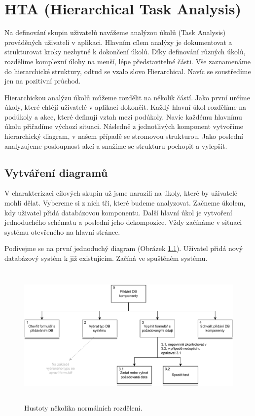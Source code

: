 \chapter{HTA (Hierarchical Task Analysis)}

Na definování skupin uživatelů navážeme analýzou úkolů (Task Analysis) prováděných uživateli v aplikaci. Hlavním cílem analýzy je dokumentovat a strukturovat kroky nezbytné k dokončení úkolů. Díky definování různých úkolů, rozdělíme komplexní úlohy na menší, lépe představitelné části. Vše zaznamenáme do hierarchické struktury, odtud se vzalo slovo Hierarchical. Navíc se soustředíme jen na pozitivní průchod.

Hierarchickou analýzu úkolů můžeme rozdělit na několik částí. Jako první určíme úkoly, které chtějí uživatelé v aplikaci dokončit. Každý hlavní úkol rozdělíme na podúkoly a akce, které definují vztah mezi podúkoly. Navíc každému hlavnímu úkolu přiřadíme výchozí situaci. Následně z jednotlivých komponent vytvoříme hierarchický diagram, v našem případě se stromovou strukturou. Jako poslední analyzujeme posloupnost akcí a snažíme se strukturu pochopit a vylepšit.

\section{Vytváření diagramů}

V charakterizaci cílových skupin už jsme narazili na úkoly, které by uživatelé mohli dělat. Vybereme si z nich tři, které budeme analyzovat. Začneme úkolem, kdy uživatel přidá databázovou komponentu. Další hlavní úkol je vytvoření jednoduchého schématu a poslední jeho dekompozice. Vždy začínáme v situaci systému otevřeného na hlavní stránce.

Podívejme se na první jednoduchý diagram (Obrázek \ref{obr03:hta1}). Uživatel přidá nový databázový systém k již existujícím. Začíná ve spuštěném systému.

\begin{figure}[htbp]
  \centering
  \includegraphics[height=70mm]{../img/HTA-1}
  \caption{Hustoty několika normálních rozdělení.}
  \label{obr03:hta1}
\end{figure}

